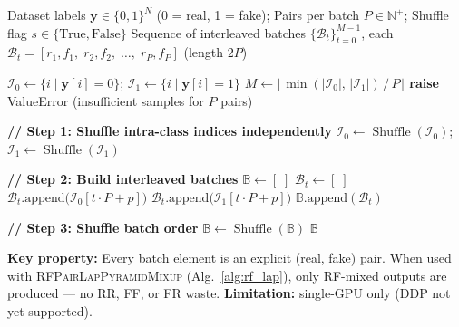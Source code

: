 \documentclass[12pt]{article}
\begin{document}
\clearpage
\begin{algorithm}[p]
\caption{BalancePairSampler (v2): Explicit (Real, Fake) Pair Construction}
\label{alg:balance_v2}
\begin{algorithmic}[1]
\Require
  Dataset labels $\mathbf{y} \in \{0,1\}^{N}$ (0 = real, 1 = fake);
  Pairs per batch $P \in \mathbb{N}^+$;
  Shuffle flag $s \in \{\text{True}, \text{False}\}$
\Ensure
  Sequence of interleaved batches $\{\mathcal{B}_t\}_{t=0}^{M-1}$,
  each $\mathcal{B}_t = [r_1, f_1,\; r_2, f_2,\; \dots,\; r_P, f_P]$ (length $2P$)

\State $\mathcal{I}_0 \gets \{i \mid \mathbf{y}[i] = 0\}$; \quad $\mathcal{I}_1 \gets \{i \mid \mathbf{y}[i] = 1\}$
\State $M \gets \big\lfloor \min(|\mathcal{I}_0|,\, |\mathcal{I}_1|) \,/\, P \big\rfloor$
  \State \textbf{raise} ValueError (insufficient samples for $P$ pairs)
\EndIf

\State \textbf{// Step 1: Shuffle intra-class indices independently}
  \State $\mathcal{I}_0 \gets \operatorname{Shuffle}(\mathcal{I}_0)$; \quad $\mathcal{I}_1 \gets \operatorname{Shuffle}(\mathcal{I}_1)$
\EndIf

\State \textbf{// Step 2: Build interleaved batches}
\State $\mathbb{B} \gets [\;]$
  \State $\mathcal{B}_t \gets [\;]$
    \State $\mathcal{B}_t.\text{append}\big(\mathcal{I}_0[t \cdot P + p]\big)$ 
    \State $\mathcal{B}_t.\text{append}\big(\mathcal{I}_1[t \cdot P + p]\big)$ 
  \EndFor
  \State $\mathbb{B}.\text{append}(\mathcal{B}_t)$
\EndFor

\State \textbf{// Step 3: Shuffle batch order}
  \State $\mathbb{B} \gets \operatorname{Shuffle}(\mathbb{B})$
\EndIf
\State \Return $\mathbb{B}$

\vspace{4pt}
\State \textbf{Key property:} Every batch element is an explicit (real, fake) pair.
\State When used with \textsc{RFPairLapPyramidMixup} (Alg.~\ref{alg:rf_lap}),
\State only RF-mixed outputs are produced — no RR, FF, or FR waste.
\State \textbf{Limitation:} single-GPU only (DDP not yet supported).
\end{algorithmic}
\end{algorithm}
\end{document}
